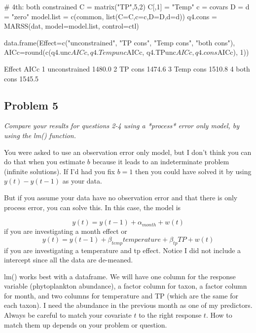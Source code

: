 \begin{Schunk}
\begin{Sinput}
 # 4th: both constrained
 C = matrix("TP",5,2)
 C[,1] = "Temp"
 c = covars
 D = d = "zero"
 model.list = c(common, list(C=C,c=c,D=D,d=d))
 q4.cons = MARSS(dat, model=model.list, control=ctl)
\end{Sinput}
\end{Schunk}
\begin{Schunk}
\begin{Sinput}
 data.frame(Effect=c("unconstrained", "TP cons", "Temp cons", "both cons"),
 		   AICc=round(c(q4.unc$AICc, q4.Tempunc$AICc,
 		                q4.TPunc$AICc, q4.cons$AICc), 1))
\end{Sinput}
\begin{Soutput}
         Effect   AICc
1 unconstrained 1480.0
2       TP cons 1474.6
3     Temp cons 1510.8
4     both cons 1545.5
\end{Soutput}
\end{Schunk}

\subsection*{Problem 5}
\textit{Compare your results for questions 2-4 using a *process* error only model, by using the lm() function.}

You were asked to use an observation error only model, but I don't think you can do that when you estimate $b$ because it leads to an indeterminate problem (infinite solutions).  If I'd had you fix $b=1$ then you could have solved it by using $y(t)-y(t-1)$ as your data.

But if you assume your data have no observation error and that there is only process error, you can solve this.  In this case, the model is

\begin{equation}
y(t) = y(t-1) + \alpha_{month} + w(t)
\end{equation}
if you are investigating a month effect or
\begin{equation}
y(t) = y(t-1) + \beta_{temp}temperature + \beta_{tp}TP + w(t)
\end{equation}
if you are investigating a temperature and tp effect.  Notice I did not include a intercept since all the data are de-meaned.

lm() works best with a dataframe.  We will have one column for the response variable (phytoplankton abundance), a factor column for taxon, a factor column for month, and two columns for temperature and TP (which are the same for each taxon).  I need the abundance in the previous month as one of my predictors.  Always be careful to match your covariate $t$ to the right response $t$.  How to match them up depends on your problem or question.

